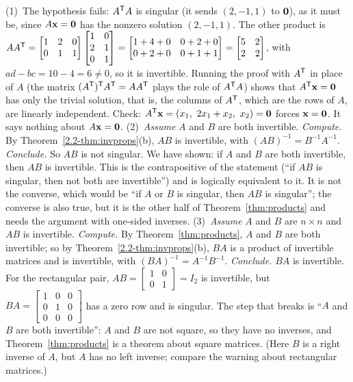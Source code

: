 \documentclass[11pt]{article}
\begin{document}
\begin{description}[leftmargin=0pt,itemsep=5pt]
  \item[Pause and think \ref{think:habits}.] (1)~The hypothesis fails: $A^{\mathsf T} A$ is singular (it sends $(2,-1,1)$ to $\mathbf{0}$), as it must be, since $A\mathbf{x}=\mathbf{0}$ has the nonzero solution $(2,-1,1)$. The other product is $AA^{\mathsf T}=\begin{bmatrix}1&2&0\\0&1&1\end{bmatrix}\begin{bmatrix}1&0\\2&1\\0&1\end{bmatrix}=\begin{bmatrix}1+4+0&0+2+0\\0+2+0&0+1+1\end{bmatrix}=\begin{bmatrix}5&2\\2&2\end{bmatrix}$, with $ad-bc=10-4=6\neq0$, so it is invertible. Running the proof with $A^{\mathsf T}$ in place of $A$ (the matrix $(A^{\mathsf T})^{\mathsf T} A^{\mathsf T}=AA^{\mathsf T}$ plays the role of $A^{\mathsf T} A$) shows that $A^{\mathsf T}\mathbf{x}=\mathbf{0}$ has only the trivial solution, that is, the columns of $A^{\mathsf T}$, which are the rows of $A$, are linearly independent. Check: $A^{\mathsf T}\mathbf{x}=(x_1,\ 2x_1+x_2,\ x_2)=\mathbf{0}$ forces $\mathbf{x}=\mathbf{0}$. It says nothing about $A\mathbf{x}=\mathbf{0}$. (2)~\emph{Assume} $A$ and $B$ are both invertible. \emph{Compute.} By Theorem~\ref{2.2-thm:invprops}(b), $AB$ is invertible, with $(AB)^{-1}=B^{-1}A^{-1}$. \emph{Conclude.} So $AB$ is not singular. We have shown: if $A$ and $B$ are both invertible, then $AB$ is invertible. This is the contrapositive of the statement (``if $AB$ is singular, then not both are invertible'') and is logically equivalent to it. It is not the converse, which would be ``if $A$ or $B$ is singular, then $AB$ is singular''; the converse is also true, but it is the other half of Theorem~\ref{thm:products} and needs the argument with one-sided inverses. (3)~\emph{Assume} $A$ and $B$ are $n\times n$ and $AB$ is invertible. \emph{Compute.} By Theorem~\ref{thm:products}, $A$ and $B$ are both invertible; so by Theorem~\ref{2.2-thm:invprops}(b), $BA$ is a product of invertible matrices and is invertible, with $(BA)^{-1}=A^{-1}B^{-1}$. \emph{Conclude.} $BA$ is invertible. For the rectangular pair, $AB=\begin{bmatrix}1&0\\0&1\end{bmatrix}=I_2$ is invertible, but $BA=\begin{bmatrix}1&0&0\\0&1&0\\0&0&0\end{bmatrix}$ has a zero row and is singular. The step that breaks is ``$A$ and $B$ are both invertible'': $A$ and $B$ are not square, so they have no inverses, and Theorem~\ref{thm:products} is a theorem about square matrices. (Here $B$ is a right inverse of $A$, but $A$ has no left inverse; compare the warning about rectangular matrices.)

\end{description}
\end{document}
